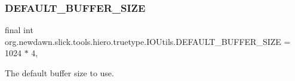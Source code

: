 \subsubsection{\texorpdfstring{D\+E\+F\+A\+U\+L\+T\+\_\+\+B\+U\+F\+F\+E\+R\+\_\+\+S\+I\+ZE}{DEFAULT\_BUFFER\_SIZE}}
{\footnotesize\ttfamily final int org.\+newdawn.\+slick.\+tools.\+hiero.\+truetype.\+I\+O\+Utils.\+D\+E\+F\+A\+U\+L\+T\+\_\+\+B\+U\+F\+F\+E\+R\+\_\+\+S\+I\+ZE = 1024 $\ast$ 4\hspace{0.3cm}{\ttfamily [static]}, {\ttfamily [private]}}

The default buffer size to use. 